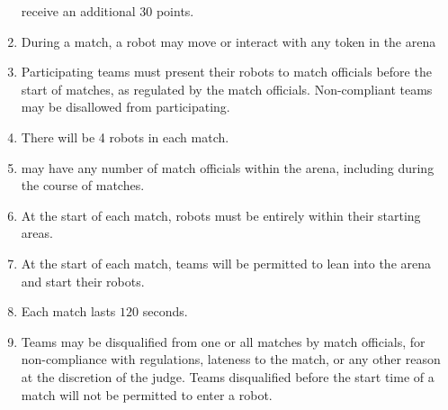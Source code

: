 \begin{enumerate}
        receive an additional 30 points.
  \item During a match, a robot may move or interact with any token in the arena
  \item Participating teams must present their robots to match officials before
        the start of matches, as regulated by the match officials. Non-compliant
        teams may be disallowed from participating.
  \item There will be 4 robots in each match.
  \item \org may have any number of match officials within the arena, including
        during the course of matches.
  \item At the start of each match, robots must be entirely within their
        starting areas.
  \item At the start of each match, teams will be permitted to lean into the
        arena and start their robots.
  \item Each match lasts $120$ seconds.
  \item Teams may be disqualified from one or all matches by match officials,
        for non-compliance with regulations, lateness to the match, or any other
        reason at the discretion of the judge. Teams disqualified before the
        start time of a match will not be permitted to enter a robot.
\end{enumerate}
